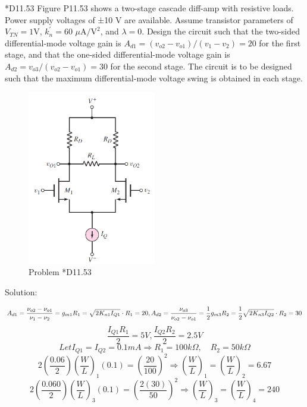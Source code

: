 \documentclass[a4paper,11pt,UTF8]{article}
\begin{document}
*D11.53  Figure P11.53 shows a two-stage cascade diff-amp with resistive loads. Power supply voltages of ±10 V are available. Assume transistor parameters of $V_{TN}=1$V, $k_n^{\prime}=60$ $\mu\mathrm{A/V^2}$, and $\lambda=0$. Design the circuit such that the two-sided differential-mode voltage gain is $A_{d1}=(v_{o2}-v_{o1})/(v_1-v_2)=20$ for the first stage, and that the one-sided differential-mode voltage gain is $A_{d2}=v_{o3}/(v_{o2}-v_{o1})=30$ for the second stage. The circuit is to be designed such that the maximum differential-mode voltage swing is obtained in each stage.
\begin{figure}[H]
	\centering
	\includegraphics[width=0.5\textwidth]{11.47}
	\caption{Problem *D11.53}
\end{figure}
\noindent Solution:

$$ \\
	A_{d1}=\frac{\nu_{o2}-\nu_{o1}}{\nu_{1}-\nu_{2}}=g_{m1}R_{1}=\sqrt{2K_{n1}I_{Q1}}\cdot R_{1}=20 ,
	A_{d2}=\frac{\nu_{o3}}{\nu_{o2}-\nu_{o1}}=\frac{1}{2}g_{m3}R_{2}=\frac{1}{2}\sqrt{2K_{n3}I_{Q2}}\cdot R_{2}=30 
$$
$$
	\frac{I_{Q1}R_{1}}{2}=5V,\frac{I_{Q2}R_{2}}{2}=2.5V
	$$
$$
	{Let}I_{Q1}=I_{Q2}=0.1mA\Rightarrow R_{1}=100k\Omega,\quad R_{2}=50k\Omega
$$ 
$$
	2{\left({\frac{0.06}{2}}\right)}{\left({\frac{W}{L}}\right)}_{1}\left(0.1\right)={\left({\frac{20}{100}}\right)}^{2}\Rightarrow{\left({\frac{W}{L}}\right)}_{1}={\left({\frac{W}{L}}\right)}_{2}=6.67 
$$
$$
	2{\left({\frac{0.060}{2}}\right)}{\left({\frac{W}{L}}\right)}_{3}{\left(0.1\right)}={\left({\frac{2\left(30\right)}{50}}\right)}^{2}\Rightarrow{\left({\frac{W}{L}}\right)}_{3}={\left({\frac{W}{L}}\right)}_{4}=240
$$
\end{document}
